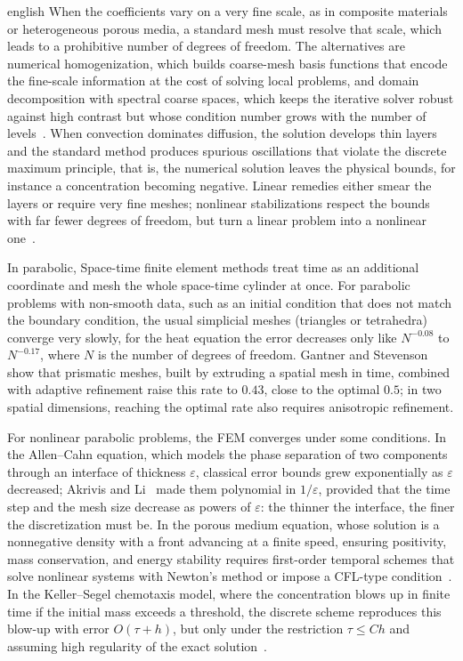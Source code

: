\documentclass[0000.tex]{subfiles}
\begin{document}
\begin{hyphenrules}{english}
When the coefficients vary on a very fine scale, as in composite materials or heterogeneous porous media, a standard mesh must resolve that scale, which leads to 
a prohibitive number of degrees of freedom. The alternatives are numerical homogenization, which builds coarse-mesh basis functions that encode the fine-scale information 
at the cost of solving local problems, and domain decomposition with spectral coarse spaces, which keeps the iterative solver robust against high contrast but 
whose condition number grows with the number of levels~\cite{hauck2023super,bastian2022multilevel}. When convection dominates diffusion, the solution develops thin layers and the standard method produces spurious oscillations that violate the 
discrete maximum principle, that is, the numerical solution leaves the physical bounds, for instance a concentration becoming negative. Linear remedies either 
smear the layers or require very fine meshes; nonlinear stabilizations respect the bounds with far fewer degrees of freedom, but turn a linear problem into a nonlinear 
one~\cite{barrenechea2024finite}.

In parabolic, Space-time finite element methods treat time as an additional coordinate and mesh the whole space-time cylinder at once. For parabolic problems with
non-smooth data, such as an initial condition that does not match the boundary condition, the usual simplicial meshes (triangles or tetrahedra) converge very slowly, 
for the heat equation the error decreases only like $N^{-0.08}$ to $N^{-0.17}$, where $N$ is the number of degrees of freedom. Gantner and Stevenson~\cite{gantner2024improved} 
show that prismatic meshes, built by extruding a spatial mesh in time, combined with adaptive refinement raise this rate to $0.43$, close to the optimal $0.5$; 
in two spatial dimensions, reaching the optimal rate also requires anisotropic refinement.

For nonlinear parabolic problems, the FEM converges under some conditions. In the Allen--Cahn equation, which models the phase separation of two components 
through an interface of thickness $\varepsilon$, classical error bounds grew exponentially as $\varepsilon$ decreased; Akrivis and Li~\cite{akrivis2022error}
made them polynomial in $1/\varepsilon$, provided that the time step and the mesh size decrease as powers of $\varepsilon$: the thinner the
interface, the finer the discretization must be. In the porous medium equation, whose solution is a nonnegative density with a front advancing at a finite
speed, ensuring positivity, mass conservation, and energy stability requires first-order temporal schemes that solve nonlinear systems with
Newton's method or impose a CFL-type condition~\cite{vijaywargiya2024two}. In the Keller--Segel chemotaxis model, where the concentration blows up in finite time
if the initial mass exceeds a threshold, the discrete scheme reproduces this blow-up with error $O(\tau+h)$, but only under the restriction $\tau\le Ch$ and assuming
high regularity of the exact solution~\cite{chen2022error}.


\end{hyphenrules}
\end{document}
